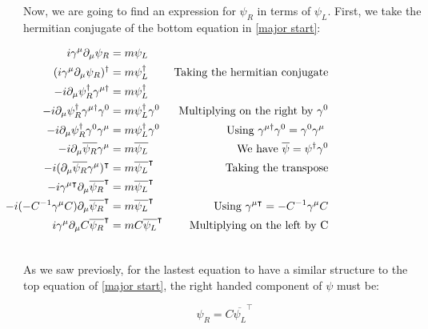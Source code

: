 Now, we are going to find an expression for $\psi_R$ in terms of $\psi_L$. First, we take the hermitian conjugate of the bottom equation in \ref{major start}:

\begin{align}
  &\begin{aligned}
     \mathllap{i \gamma^\mu \partial_\mu \psi_R} &= m\psi_L\\        
     \mathllap{(i \gamma^\mu \partial_\mu \psi_R)^\dagger} &= m\psi_L^\dagger  & \text{Taking the hermitian conjugate} \\
     \mathllap{-i \partial_\mu \psi_R^\dagger \gamma^{\mu \dagger}} &= m \psi_L^\dagger \\
     \mathllap{-i \partial_\mu \psi_R^\dagger \gamma^{\mu \dagger}\gamma^0} &= m \psi_L^\dagger \gamma^0  &\text{Multiplying on the right by $\gamma^0$}\\
     \mathllap{-i \partial_\mu \psi_R^\dagger \gamma^0 \gamma^\mu} &= m \psi_L^\dagger \gamma^0  &\text{Using $\gamma^{\mu \dagger}\gamma^0 = \gamma^0 \gamma^\mu$ }\\    %
     \mathllap{-i \partial_\mu \overline{\psi_R}\gamma^\mu} &= m \overline{\psi_L} &\text{We have $\overline{\psi} = \psi^{\dagger}\gamma^0$}\\
     \mathllap{-i (\partial_\mu \overline{\psi_R}\gamma^\mu)^\intercal} &= m \overline{\psi_L}^\intercal &\text{Taking the transpose}\\
     \mathllap{-i \gamma^{\mu \intercal} \partial_\mu \overline{\psi_R}^\intercal} &= m \overline{\psi_L}^\intercal \\
     \mathllap{-i (-C^{-1}\gamma^\mu C) \partial_\mu \overline{\psi_R}^\intercal} &= m \overline{\psi_L}^\intercal &\text{Using $\gamma^{\mu \intercal}= -C^{-1}\gamma^\mu C$}\\
     \mathllap{i \gamma^\mu \partial_\mu C \overline{\psi_R}^\intercal} &= m C \overline{\psi_L}^\intercal &\text{Multiplying on the left by C}\\
  &\end{aligned}
\end{align}

As we saw previosly, for the lastest equation to have a similar structure to the top equation of \ref{major start}, the right handed component of $\psi$ must be:

\begin{equation}
 \psi_R = C \overline{\psi_L}^\intercal
\end{equation}

